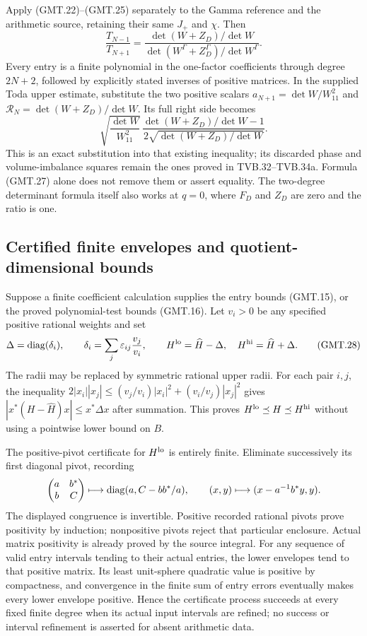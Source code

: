 Apply (GMT.22)--(GMT.25) separately to the Gamma reference and
the arithmetic source, retaining their same $J_+$ and $\chi$. Then
\[
 \boxed{\frac{T_{N-1}}{T_{N+1}}
 =\frac{\det(W+Z_D)/\det W}
        {\det(W^\Gamma+Z_D^\Gamma)/\det W^\Gamma}.}           \tag{GMT.26}
\]
Every entry is a finite polynomial in the one-factor coefficients
through degree $2N+2$, followed by explicitly stated inverses of
positive matrices. In the supplied Toda upper estimate, substitute
the two positive scalars
$a_{N+1}=\det W/W_{11}^2$ and
$\mathcal R_N=\det(W+Z_D)/\det W$.
Its full right side becomes
\[
 \sqrt{\frac{\det W}{W_{11}^2}}\,
 \frac{\det(W+Z_D)/\det W-1}
      {2\sqrt{\det(W+Z_D)/\det W}}.                            \tag{GMT.27}
\]
This is an exact substitution into that existing inequality; its
discarded phase and volume-imbalance squares remain the ones proved
in TVB.32--TVB.34a. Formula (GMT.27) alone does not remove them or
assert equality. The two-degree determinant formula itself also
works at $q=0$, where $F_D$ and $Z_D$ are zero and the ratio is one.

\subsection{Certified finite envelopes and quotient-dimensional bounds}

Suppose a finite coefficient calculation supplies the entry bounds
(GMT.15), or the proved polynomial-test bounds (GMT.16).
Let $v_i>0$ be any specified positive rational weights and set
\[
 \Delta=\operatorname{diag}(\delta_i),\qquad
 \delta_i=\sum_j\varepsilon_{ij}\frac{v_j}{v_i},\qquad
 H^{\rm lo}=\widehat H-\Delta,\quad
 H^{\rm hi}=\widehat H+\Delta.                                \tag{GMT.28}
\]
The radii may be replaced by symmetric rational upper radii.
For each pair $i,j$, the inequality
$2|x_i||x_j|\le(v_j/v_i)|x_i|^2+(v_i/v_j)|x_j|^2$
gives $|x^*(H-\widehat H)x|\le x^*\Delta x$ after summation.
This proves $H^{\rm lo}\preceq H\preceq H^{\rm hi}$ without
using a pointwise lower bound on $B$.

The positive-pivot certificate for $H^{\rm lo}$ is entirely finite.
Eliminate successively its first diagonal pivot, recording
\[
 \begin{pmatrix}a&b^*\\b&C\end{pmatrix}
 \longmapsto \operatorname{diag}(a,C-bb^*/a),
 \qquad
 (x,y)\longmapsto(x-a^{-1}b^*y,y).
\]
The displayed congruence is invertible. Positive recorded rational
pivots prove positivity by induction; nonpositive pivots reject that
particular enclosure. Actual matrix positivity is already proved by
the source integral. For any sequence of valid entry intervals tending
to their actual entries, the lower envelopes tend to that positive
matrix. Its least unit-sphere quadratic value is positive by compactness,
and convergence in the finite sum of entry errors eventually makes
every lower envelope positive. Hence the certificate process succeeds
at every fixed finite degree when its actual input intervals are refined;
no success or interval refinement is asserted for absent arithmetic data.


